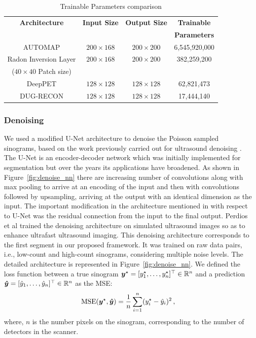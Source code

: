 \begin{table}[h!]
	
	\centering
	\caption{Trainable Parameters comparison}
	\label{table:1}
	\begin{tabular}{||c|c|c|c||} 
		\hline
		\textbf{Architecture} & \textbf{Input Size} & \textbf{Output Size} & \textbf{Trainable}   \\ 
		&                     &                       & \textbf{Parameters} \\ [0.5ex] 
		\hline
		AUTOMAP & $200\times{}168$ & $200\times{}200$ & 6,545,920,000    \\ 
		\hline
		Radon Inversion Layer   & $200\times{}168$ & $200\times{}200$ & 382,259,200   \\
		($40\times{}40$ Patch size)  &  &  & \\
		\hline
		DeepPET & $128\times{}128$ & $128\times{}128$ & 62,821,473  \\ 
		\hline
		DUG-RECON & $128\times{}128$ & $128\times{}128$ & 17,444,140  \\ 
		\hline
	\end{tabular}
\end{table}

\subsubsection{Denoising}
We used a modified U-Net architecture to denoise the Poisson sampled sinograms, based on the work previously carried out for ultrasound denoising \cite{perdios2018deep}. The U-Net is an encoder-decoder network which was initially implemented for segmentation but over the years its applications have broadened. As shown in Figure~\ref{fig:denoise_nn} there are increasing number of convolutions along with max pooling to arrive at an encoding of the input and then with convolutions followed by upsampling, arriving at the output with an identical dimension as the input. The important modification in the architecture mentioned in \cite{perdios2018deep} with respect to U-Net was the residual connection from the input to the final output. Perdios et al trained the denoising architecture on simulated ultrasound images so as to enhance ultrafast ultrasound imaging. This denoising architecture corresponds to the first segment in our proposed framework. It was trained on raw data pairs, i.e., low-count and high-count sinograms, considering multiple noise levels. The detailed architecture is represented in Figure~\ref{fig:denoise_nn}. We defined the loss function between a true sinogram $\bm{y}^\star = [y_1^\star, \dots , y_n^\star]^\top \in \mathbb{R}^n$ and a prediction 
$\bm{\hat{y}} = [\hat{y}_1, \dots , \hat{y}_n]^\top \in \mathbb{R}^n$ as the \ac{MSE}: 
\begin{equation}\label{eq:mse}
\mathrm{MSE}(\bm{y}^\star, \bm{\hat{y}}) = \frac{1}{n}   \sum_{i=1}^{n} (y^\star_i - \hat{y}_i)^2 \, ,
\end{equation}
where, $n$ is the number pixels on the sinogram, corresponding to the number of detectors in the scanner. %


